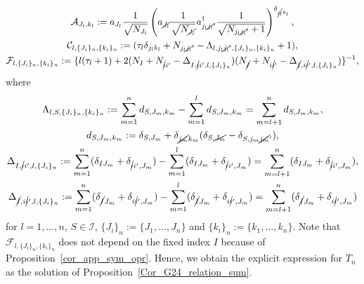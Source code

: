 \documentclass[10pt,a4paper]{amsart}
\numberwithin{equation}{section}
\begin{document}
\begin{gather*}
\mathcal{A}_{
J_{l},
k_{l}
}
:=
a_{J_{l}}
\frac{1}{\sqrt{N_{J_{l}}}}
 \left(
 a_{\cancel{J_{l}}}
 \frac{1}{
 \sqrt{
 N_{\cancel{J_{l}}}
 }
 }
 a_{j_{l}\cancel{j_{l}}'}^{\dagger}
 \frac{1}{
 \sqrt{
 N_{j_{l}\cancel{j_{l}}'}+1
 }
 }
 \right)^{\delta_{\cancel{j_{l}}k_{l}}}
,
\\
\mathcal{C}_{
l,
\{
 J_{i}
\}_{n},
\{
 k_{i}
\}_{n}
}
:=
 (
 \tau_{l}
 \delta_{j_{l}k_{l}}
 +
 N_{j_{l}\cancel{j_{l}}'}
 -
 \Lambda_{
 l,
 j_{l}\cancel{j_{l}}',
 \{
 J_{i}
 \}_{n},
 \{
 k_{i}
 \}_{n}
 }
 +
 1
 ),
\\
\mathcal{F}_{
l,
\{
 J_{i}
\}_{n},
\{
 k_{i}
\}_{n}
}
:=
\{
 l
 (
 \tau_{l}
 +
 1
 )
 +
 2
 (
 N_{I}
 +
 N_{\cancel{i}i'}
 -
 \Delta_{
 I,
 \cancel{i}i',
 l,
 \{
 J_{i}
 \}_{n}
 }
 )
 (
 N_{\cancel{I}}
 +
 N_{i\cancel{i}'}
 -
 \Delta_{
 \cancel{I},
 i\cancel{i}',
 l,
 \{
 J_{i}
 \}_{n}
 }
 )
\}^{-1},
\end{gather*}
where
\begin{gather}
\Lambda_{
 l,
 S,
 \{
 J_{i}
 \}_{n},
 \{
 k_{i}
 \}_{n}
}
:=
\sum_{m=1}^{n}
d_{
 S,
 J_{m},
 k_{m}
}
-
\sum_{m=1}^{l}
 d_{
 S,
 J_{m},
 k_{m}
}
=
\sum_{m=l+1}^{n}
d_{
 S,
 J_{m},
 k_{m}
}
,
\label{notation_Lambda}
\\
d_{
 S,
 J_{m},
 k_{m}
}
:=
\delta_{
 S,
 J_{m}
}
+
\delta_{\cancel{j_{m}}k_{m}}
 (
 \delta_{
 S,
 \cancel{J_{m}}
 }
 -
 \delta_{
 S,
 j_{m}\cancel{j_{m}}'
 }
 )
,
\label{notation_d}
\\
\Delta_{
I,
\cancel{i}i',
l,
\{
 J_{i}
\}_{n}
}
:=
\sum_{m=1}^{n}
 (
 \delta_{IJ_{m}}
 +
 \delta_{\cancel{i}i',J_{m}}
 )
-
\sum_{m=1}^{l}
 (
 \delta_{IJ_{m}}
 +
 \delta_{\cancel{i}i',J_{m}}
 )
=
\sum_{m=l+1}^{n}
 (
 \delta_{IJ_{m}}
 +
 \delta_{\cancel{i}i',J_{m}}
 )
,
\label{notation_delta_Iisi}
\\
\Delta_{
\cancel{I},
i\cancel{i}',
l,
\{
 J_{i}
\}_{n}
}
:=
\sum_{m=1}^{n}
 (
 \delta_{\cancel{I}J_{m}}
 +
 \delta_{i\cancel{i}',J_{m}}
 )
-
\sum_{m=1}^{l}
 (
 \delta_{\cancel{I}J_{m}}
 +
 \delta_{i\cancel{i}',J_{m}}
 )
=
\sum_{m=l+1}^{n}
 (
 \delta_{\cancel{I}J_{m}}
 +
 \delta_{i\cancel{i}',J_{m}}
 )
\label{notation_delta_Isiis}
\end{gather}
for $l=1,\dots,n$,
$
S
\in
\mathcal{I}
$,
$
\{
 J_{i}
\}_{n}
:=
\{
J_{1},
\dots,
J_{n}
\}
$
and
$
\{
 k_{i}
\}_{n}
:=
\{
k_{1},
\dots,
k_{n}
\}
$.
Note that
$
\mathcal{F}_{
l,
\{
 J_{i}
\}_{n},
\{
 k_{i}
\}_{n}
}
$
does not depend on the fixed index $I$ because of
Proposition~\ref{cor_app_sym_opr}.
Hence, we obtain the explicit expression for $T_{n}$ as the solution of
Proposition~\ref{Cor_G24_relation_sum}.
\end{document}
